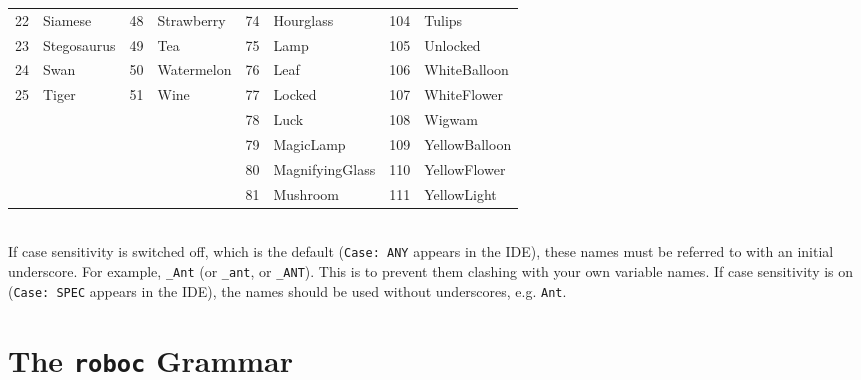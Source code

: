 \documentclass[12pt,a4paper,twoside]{article}
\renewcommand{\_}{\texttt{\symbol{95}}}
\begin{document}
\begin{tabular}{|ll|ll|ll|ll|}
 22 & Siamese     & 48 & Strawberry & 74 & Hourglass       & 104 & Tulips\\
 23 & Stegosaurus & 49 & Tea        & 75 & Lamp            & 105 & Unlocked\\
 24 & Swan        & 50 & Watermelon & 76 & Leaf            & 106 & WhiteBalloon\\
 25 & Tiger       & 51 & Wine       & 77 & Locked          & 107 & WhiteFlower\\
    &             &    &            & 78 & Luck            & 108 & Wigwam\\
    &             &    &            & 79 & MagicLamp       & 109 & YellowBalloon\\
    &             &    &            & 80 & MagnifyingGlass & 110 & YellowFlower\\
    &             &    &            & 81 & Mushroom        & 111 & YellowLight\\
\hline
\end{tabular}
\\[5mm]
If case sensitivity is switched off, which is the
default (\verb^Case: ANY^ appears in the IDE), these names must be referred
to with an initial underscore. For example, \verb^_Ant^ (or \verb^_ant^,
or \verb^_ANT^).
This is to prevent them clashing with your own variable names.
If case sensitivity is on (\verb^Case: SPEC^ appears in the IDE), the names
should be used without underscores, e.g. \verb^Ant^.

\appendix
\newpage
\section{The \textbf{\texttt{roboc}} Grammar}
\end{document}
